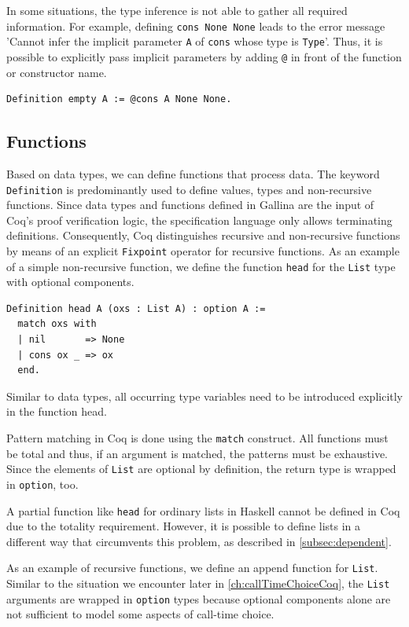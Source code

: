 \documentclass[a4paper, 11pt, fleqn, twoside, abstract=on]{scrreprt}
\newcommand{\cinl}[1]{\texttt{#1}}
\begin{document}
In some situations, the type inference is not able to gather all required information.
For example, defining \cinl{cons None None} leads to the error message 'Cannot infer the implicit parameter \cinl{A} of \cinl{cons} whose type is \cinl{Type}'.
Thus, it is possible to explicitly pass implicit parameters by adding \cinl{@} in front of the function or constructor name.
\begin{verbatim}
Definition empty A := @cons A None None.
\end{verbatim}

\subsection{Functions}
\label{subsec:coqFunctions}

Based on data types, we can define functions that process data.
The keyword \cinl{Definition} is predominantly used to define values, types and non-recursive functions.
Since data types and functions defined in Gallina are the input of Coq's proof verification logic, the specification language only allows terminating definitions.
Consequently, Coq distinguishes recursive and non-recursive functions by means of an explicit \cinl{Fixpoint} operator for recursive functions.
As an example of a simple non-recursive function, we define the function \cinl{head} for the \cinl{List} type with optional components.

\begin{verbatim}
Definition head A (oxs : List A) : option A :=
  match oxs with
  | nil       => None
  | cons ox _ => ox
  end.
\end{verbatim}
\noindent
Similar to data types, all occurring type variables need to be introduced explicitly in the function head.

Pattern matching in Coq is done using the \cinl{match} construct.
All functions must be total and thus, if an argument is matched, the patterns must be exhaustive.
Since the elements of \cinl{List} are optional by definition, the return type is wrapped in \cinl{option}, too.

A partial function like \cinl{head} for ordinary lists in Haskell cannot be defined in Coq due to the totality requirement.
However, it is possible to define lists in a different way that circumvents this problem, as described in \autoref{subsec:dependent}.

As an example of recursive functions, we define an append function for \cinl{List}.
Similar to the situation we encounter later in \autoref{ch:callTimeChoiceCoq}, the \cinl{List} arguments are wrapped in \cinl{option} types because optional components alone are not sufficient to model some aspects of call-time choice.
\end{document}

